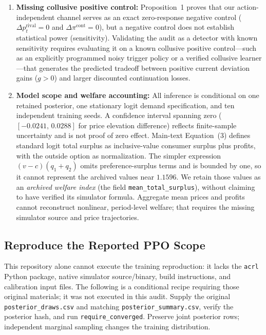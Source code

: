 \documentclass{article}
\begin{document}
\begin{enumerate}
\item \textbf{Missing collusive positive control:} Proposition~1 proves that our action-independent channel serves as an exact zero-response negative control ($\Delta p_t^{\mathrm{rival}}=0$ and $\Delta\pi^{\mathrm{cont}}=0$), but a negative control does not establish statistical power (sensitivity). Validating the audit as a detector with known sensitivity requires evaluating it on a known collusive positive control---such as an explicitly programmed noisy trigger policy or a verified collusive learner---that generates the predicted tradeoff between positive current deviation gains ($g>0$) and larger discounted continuation losses.
\item \textbf{Model scope and welfare accounting:} All inference is conditional on one retained posterior, one stationary logit demand specification, and ten independent training seeds. A confidence interval spanning zero ($[-0.0241,\,0.0288]$ for price elevation difference) reflects finite-sample uncertainty and is not proof of zero effect. Main-text Equation~(3) defines standard logit total surplus as inclusive-value consumer surplus plus profits, with the outside option as normalization. The simpler expression $(v-c)(q_1+q_2)$ omits preference-surplus terms and is bounded by one, so it cannot represent the archived values near $1.1596$. We retain those values as an \emph{archived welfare index} (the field \texttt{mean\_total\_surplus}), without claiming to have verified its simulator formula. Aggregate mean prices and profits cannot reconstruct nonlinear, period-level welfare; that requires the missing simulator source and price trajectories.
\end{enumerate}

\subsection{Reproduce the Reported PPO Scope}

This repository alone cannot execute the training reproduction: it lacks the \texttt{acrl} Python package, native simulator source/binary, build instructions, and calibration input files. The following is a conditional recipe requiring those original materials; it was not executed in this audit. Supply the original \texttt{posterior\_draws.csv} and matching \texttt{posterior\_summary.csv}, verify the posterior hash, and run \texttt{require\_converged}. Preserve joint posterior rows; independent marginal sampling changes the training distribution.
\end{document}
